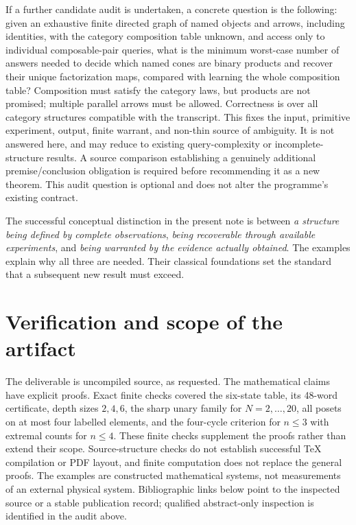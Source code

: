 \documentclass[11pt]{article}
\theoremstyle{remark}
\begin{document}
If a further candidate audit is undertaken, a concrete question is the following: given an exhaustive finite directed graph of named objects and arrows, including identities, with the category composition table unknown, and access only to individual composable-pair queries, what is the minimum worst-case number of answers needed to decide which named cones are binary products and recover their unique factorization maps, compared with learning the whole composition table? Composition must satisfy the category laws, but products are not promised; multiple parallel arrows must be allowed. Correctness is over all category structures compatible with the transcript. This fixes the input, primitive experiment, output, finite warrant, and non-thin source of ambiguity. It is not answered here, and may reduce to existing query-complexity or incomplete-structure results. A source comparison establishing a genuinely additional premise/conclusion obligation is required before recommending it as a new theorem. This audit question is optional and does not alter the programme's existing contract.

The successful conceptual distinction in the present note is between \emph{a structure being defined by complete observations}, \emph{being recoverable through available experiments}, and \emph{being warranted by the evidence actually obtained}. The examples explain why all three are needed. Their classical foundations set the standard that a subsequent new result must exceed.

\section*{Verification and scope of the artifact}
The deliverable is uncompiled source, as requested. The mathematical claims have explicit proofs. Exact finite checks covered the six-state table, its 48-word certificate, depth sizes $2,4,6$, the sharp unary family for $N=2,\ldots,20$, all posets on at most four labelled elements, and the four-cycle criterion for $n\le3$ with extremal counts for $n\le4$. These finite checks supplement the proofs rather than extend their scope. Source-structure checks do not establish successful TeX compilation or PDF layout, and finite computation does not replace the general proofs. The examples are constructed mathematical systems, not measurements of an external physical system. Bibliographic links below point to the inspected source or a stable publication record; qualified abstract-only inspection is identified in the audit above.
\end{document}

